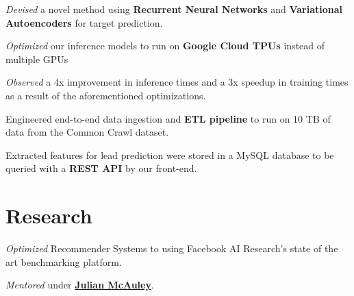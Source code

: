 \documentclass[]{devanshu-resume-openfont}
\begin{document}
\begin{minipage}[t]{0.66\textwidth}
\begin{tightemize}
\item \emph{Devised} a novel method using \textbf{Recurrent Neural Networks} and \textbf{Variational Autoencoders} for target prediction.
\item \emph{Optimized} our inference models to run on \textbf{Google Cloud TPUs} instead of multiple GPUs
\item \emph{Observed} a 4x improvement in inference times and a 3x speedup in training times as a result of the aforementioned optimizations.
\item {Engineered} end-to-end data ingestion and \textbf{ETL pipeline} to
    run on 10 TB of data from the Common Crawl dataset.
\item Extracted features for lead prediction were stored in a MySQL database to be queried with a \textbf{REST API} by our front-end.
\end{tightemize}
\sectionsep


\section{Research}
\begin{tightemize}
\item \emph{Optimized} Recommender Systems to using Facebook AI Research's
    state of the art benchmarking platform.
\item \emph{Mentored} under
    \textbf{\href{https://scholar.google.com/citations?user=icbo4M0AAAAJ&hl=en}{Julian McAuley}}.
\end{tightemize}
\sectionsep


\end{minipage}
\end{document}
